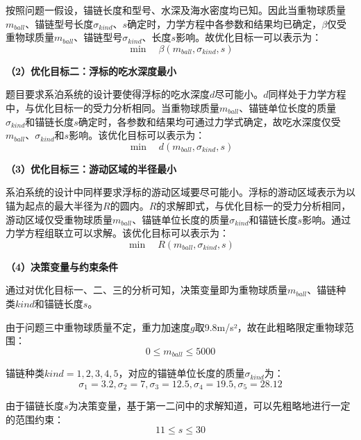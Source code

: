 \documentclass[withoutpreface,bwprint]{cumcmthesis}
\begin{document}
按照问题一假设，锚链长度和型号、水深及海水密度均已知。因此当重物球质量$m_{ball}$、锚链型号长度$\sigma_{kind}$、$s$确定时，力学方程中各参数和结果均已确定，$\beta$仅受重物球质量$m_{ball}$、锚链型号$\sigma_{kind}$、长度$s$影响。故优化目标一可以表示为：
\begin{equation}
\min \quad \beta(m_{ball}, \sigma_{kind}, s)
\end{equation}

\textbf{（2）优化目标二：浮标的吃水深度最小}

题目要求系泊系统的设计要使得浮标的吃水深度$d$尽可能小。$d$同样处于力学方程中，与优化目标一的受力分析相同。当重物球质量$m_{ball}$、锚链单位长度的质量$\sigma_{kind}$和锚链长度$s$确定时，各参数和结果均可通过力学式确定，故吃水深度仅受$m_{ball}$、$\sigma_{kind}$和$s$影响。该优化目标可以表示为：
\begin{equation}
\min \quad d(m_{ball}, \sigma_{kind}, s)
\end{equation}

\textbf{（3）优化目标三：游动区域的半径最小}

系泊系统的设计中同样要求浮标的游动区域要尽可能小。浮标的游动区域表示为以锚为起点的最大半径为$R$的圆内。$R$的求解即式，与优化目标一的受力分析相同，游动区域仅受重物球质量$m_{ball}$、锚链单位长度的质量$\sigma_{kind}$和锚链长度$s$影响。通过力学方程组联立可以求解。该优化目标可以表示为：
\begin{equation}
\min \quad R(m_{ball}, \sigma_{kind}, s)
\end{equation}

\textbf{（4）决策变量与约束条件}

通过对优化目标一、二、三的分析可知，决策变量即为重物球质量$m_{ball}$、锚链种类$kind$和锚链长度$s$。

由于问题三中重物球质量不定，重力加速度$g$取9.8m/s²，故在此粗略限定重物球范围：
\begin{equation}
0 \leq m_{ball} \leq 5000
\end{equation}

锚链种类$kind = 1,2,3,4,5$，对应的锚链单位长度的质量$\sigma_{kind}$为：
\begin{equation}
\sigma_1 = 3.2, \sigma_2 = 7, \sigma_3 = 12.5, \sigma_4 = 19.5, \sigma_5 = 28.12
\end{equation}

由于锚链长度$s$为决策变量，基于第一二问中的求解知道，可以先粗略地进行一定的范围约束：
\begin{equation}
11 \leq s \leq 30
\end{equation}
\end{document}
